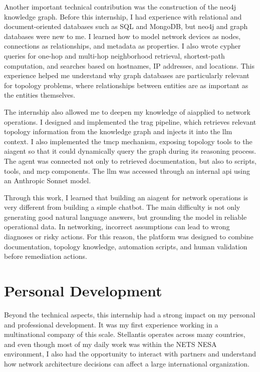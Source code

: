 \documentclass[11pt,a4paper]{report}
\begin{document}
Another important technical contribution was the construction of the  \gls{neo4j}  knowledge graph. Before this internship, I had experience with relational and document-oriented databases such as SQL and MongoDB, but  \gls{neo4j}  and graph databases were new to me. I learned how to model network devices as nodes, connections as relationships, and metadata as properties. I also wrote  \gls{cypher}  queries for one-hop and multi-hop neighborhood retrieval, shortest-path computation, and searches based on hostnames, IP addresses, and locations. This experience helped me understand why graph databases are particularly relevant for \gls{topology} problems, where relationships between entities are as important as the entities themselves.

The internship also allowed me to deepen my knowledge of \gls{ai}applied to network operations. I designed and implemented the  \gls{trag}  pipeline, which retrieves relevant topology information from the knowledge graph and injects it into the \gls{llm}  context. I also implemented the  \gls{tmcp}  mechanism, exposing topology tools to the \gls{ai}agent so that it could dynamically query the graph during its reasoning process. The agent was connected not only to retrieved documentation, but also to scripts, tools, and \gls{mcp}  components. The \gls{llm}  was accessed through an internal \gls{api} using an Anthropic Sonnet model.

Through this work, I learned that building an \gls{ai}agent for network operations is very different from building a simple chatbot. The main difficulty is not only generating good natural language answers, but \gls{grounding} the model in reliable operational data. In networking, incorrect assumptions can lead to wrong diagnoses or risky actions. For this reason, the platform was designed to combine documentation, topology knowledge, automation scripts, and human validation before remediation actions.

\section*{Personal Development}

Beyond the technical aspects, this internship had a strong impact on my personal and professional development. It was my first experience working in a multinational company of this scale. Stellantis operates across many countries, and even though most of my daily work was within the NETS NESA environment, I also had the opportunity to interact with partners and understand how network architecture decisions can affect a large international organization.
\end{document}
